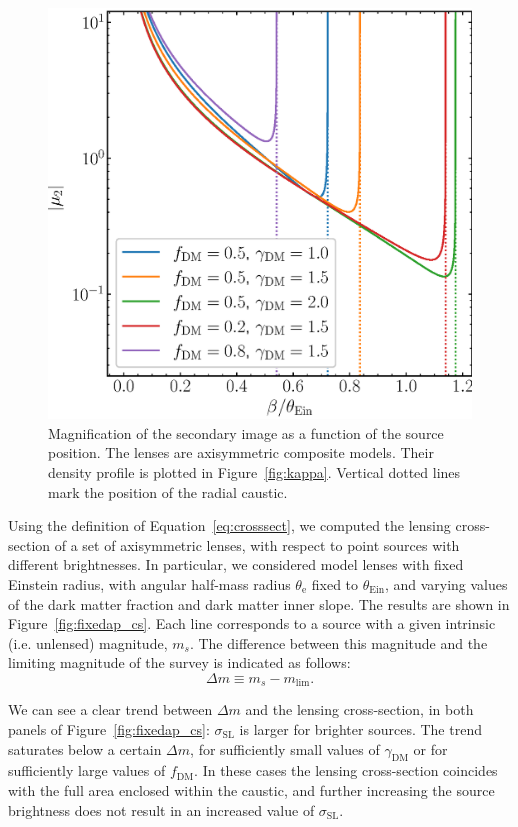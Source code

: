 \documentclass{aa}
\def\gammadm{\gamma_{\mathrm{DM}}}
\def\fdm{f_{\mathrm{DM}}}
\def\tein{\theta_{\mathrm{Ein}}}
\def\teff{\theta_{\mathrm{e}}}
\def\crosssect{\sigma_\mathrm{{SL}}}
\def\Fref#1{Figure~\ref{#1}\xspace}
\def\Eref#1{Equation~\ref{#1}\xspace}
\begin{document}
%
\begin{figure}
\includegraphics[width=\columnwidth]{composite_fixedap_mu2.eps}
\caption{
Magnification of the secondary image as a function of the source position.
The lenses are axisymmetric composite models. Their density profile is plotted in \Fref{fig:kappa}.
Vertical dotted lines mark the position of the radial caustic.
\label{fig:1dmag}
}
\end{figure}

Using the definition of \Eref{eq:crosssect}, we computed the lensing cross-section of a set of axisymmetric lenses, with respect to point sources with different brightnesses.
In particular, we considered model lenses with fixed Einstein radius, with angular half-mass radius $\teff$ fixed to $\tein$, and varying values of the dark matter fraction and dark matter inner slope.
The results are shown in \Fref{fig:fixedap_cs}.
Each line corresponds to a source with a given intrinsic (i.e. unlensed) magnitude, $m_s$. The difference between this magnitude and the limiting magnitude of the survey is indicated as follows:
\begin{equation}
\Delta m \equiv m_s - m_{\mathrm{lim}}.
\end{equation}

We can see a clear trend between $\Delta m$ and the lensing cross-section, in both panels of \Fref{fig:fixedap_cs}: $\crosssect$ is larger for brighter sources.
The trend saturates below a certain $\Delta m$, for sufficiently small values of $\gammadm$ or for sufficiently large values of $\fdm$.
In these cases the lensing cross-section coincides with the full area enclosed within the caustic, and further increasing the source brightness does not result in an increased value of $\crosssect$.
\end{document}
